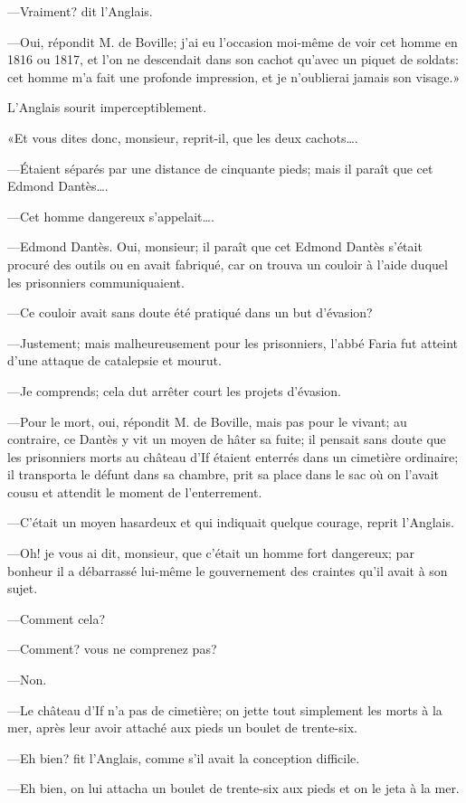 —Vraiment? dit l'Anglais.

—Oui, répondit M. de Boville; j'ai eu l'occasion moi-même de voir cet homme en 1816 ou 1817, et l'on ne descendait dans son cachot qu'avec un piquet de soldats: cet homme m'a fait une profonde impression, et je n'oublierai jamais son visage.»

L'Anglais sourit imperceptiblement.

«Et vous dites donc, monsieur, reprit-il, que les deux cachots\dots.

—Étaient séparés par une distance de cinquante pieds; mais il paraît que cet Edmond Dantès\dots.

—Cet homme dangereux s'appelait\dots.

—Edmond Dantès. Oui, monsieur; il paraît que cet Edmond Dantès s'était procuré des outils ou en avait fabriqué, car on trouva un couloir à l'aide duquel les prisonniers communiquaient.

—Ce couloir avait sans doute été pratiqué dans un but d'évasion?

—Justement; mais malheureusement pour les prisonniers, l'abbé Faria fut atteint d'une attaque de catalepsie et mourut.

—Je comprends; cela dut arrêter court les projets d'évasion.

—Pour le mort, oui, répondit M. de Boville, mais pas pour le vivant; au contraire, ce Dantès y vit un moyen de hâter sa fuite; il pensait sans doute que les prisonniers morts au château d'If étaient enterrés dans un cimetière ordinaire; il transporta le défunt dans sa chambre, prit sa place dans le sac où on l'avait cousu et attendit le moment de l'enterrement.

—C'était un moyen hasardeux et qui indiquait quelque courage, reprit l'Anglais.

—Oh! je vous ai dit, monsieur, que c'était un homme fort dangereux; par bonheur il a débarrassé lui-même le gouvernement des craintes qu'il avait à son sujet.

—Comment cela?

—Comment? vous ne comprenez pas?

—Non.

—Le château d'If n'a pas de cimetière; on jette tout simplement les morts à la mer, après leur avoir attaché aux pieds un boulet de trente-six.

—Eh bien? fit l'Anglais, comme s'il avait la conception difficile.

—Eh bien, on lui attacha un boulet de trente-six aux pieds et on le jeta à la mer.


